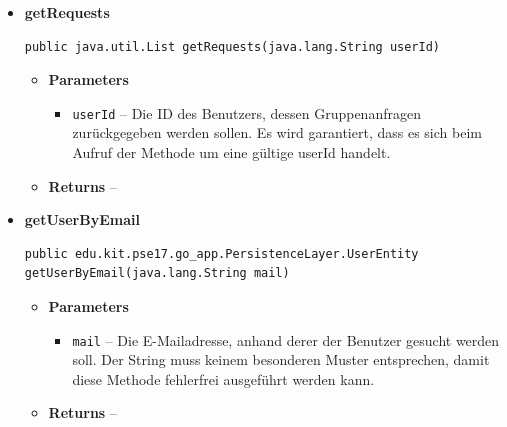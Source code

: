 \documentclass[11pt,a4paper]{article}
\begin{document}
{{{{{{{{{{{{{{\begin{itemize}
{\begin{itemize}
{}%
\end{itemize}
}%
\item{ 
\hypertarget{edu.kit.pse17.go_app.PersistenceLayer.daos.UserDaoImp.getRequests(java.lang.String)}{{\bf  getRequests}\\}
\begin{lstlisting}[frame=none]
public java.util.List getRequests(java.lang.String userId)\end{lstlisting} %
\begin{itemize}
\item{
{\bf  Parameters}
  \begin{itemize}
   \item{
\texttt{userId} -- Die ID des Benutzers, dessen Gruppenanfragen zurückgegeben werden sollen. Es wird garantiert, dass es sich beim Aufruf der Methode um eine gültige userId handelt.}
  \end{itemize}
}%
\item{{\bf  Returns} -- 
 
}%
\end{itemize}
}%
\item{ 
\hypertarget{edu.kit.pse17.go_app.PersistenceLayer.daos.UserDaoImp.getUserByEmail(java.lang.String)}{{\bf  getUserByEmail}\\}
\begin{lstlisting}[frame=none]
public edu.kit.pse17.go_app.PersistenceLayer.UserEntity getUserByEmail(java.lang.String mail)\end{lstlisting} %
\begin{itemize}
\item{
{\bf  Parameters}
  \begin{itemize}
   \item{
\texttt{mail} -- Die E-Mailadresse, anhand derer der Benutzer gesucht werden soll. Der String muss keinem besonderen Muster entsprechen, damit diese Methode fehlerfrei ausgeführt werden kann.}
  \end{itemize}
}%
\item{{\bf  Returns} -- 
 
}
\end{itemize}}
\end{itemize}}}}}}}}}}}}}}}
\end{document}
